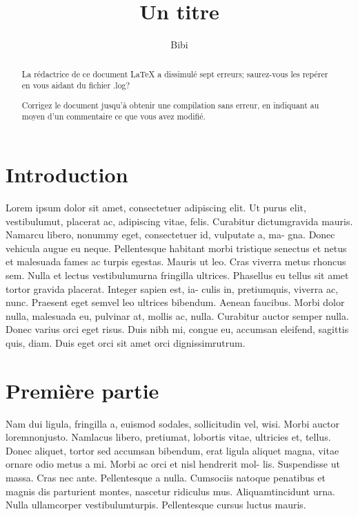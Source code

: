 \documentclass{article}
\title{Un titre}%
\author{Bibi}%
\begin{document}
	\maketitle

\begin{abstract}
La rédactrice de ce document \LaTeX{} a dissimulé sept erreurs; saurez-vous les repérer en vous aidant du fichier .log? 

Corrigez le document jusqu'à obtenir une compilation sans erreur, en indiquant au moyen d'un commentaire ce que vous avez modifié.
\end{abstract}%

\section*{Introduction}

Lorem ipsum dolor sit amet, consectetuer adipiscing elit. Ut purus elit,
vestibulumut, placerat ac, adipiscing vitae, felis. Curabitur dictumgravida
mauris. Namarcu libero, nonummy eget, consectetuer id, vulputate a, ma-
gna. Donec vehicula augue eu neque. Pellentesque habitant morbi tristique
senectus et netus et malesuada fames ac turpis egestas. Mauris ut leo. Cras
viverra metus rhoncus sem. Nulla et lectus vestibulumurna fringilla ultrices.
Phasellus eu tellus sit amet tortor gravida placerat. Integer sapien est, ia-
culis in, pretiumquis, viverra ac, nunc. Praesent eget semvel leo ultrices
bibendum. Aenean faucibus. Morbi dolor nulla, malesuada eu, pulvinar at,
mollis ac, nulla. Curabitur auctor semper nulla. Donec varius orci eget risus.
Duis nibh mi, congue eu, accumsan eleifend, sagittis quis, diam. Duis eget
orci sit amet orci dignissimrutrum.

\section{Première partie}%
Nam dui ligula, fringilla a, euismod sodales, sollicitudin vel, wisi. Morbi
auctor loremnonjusto. Namlacus libero, pretiumat, lobortis vitae, ultricies
et, tellus. Donec aliquet, tortor sed accumsan bibendum, erat ligula aliquet
magna, vitae ornare odio metus a mi. Morbi ac orci et nisl hendrerit mol-
lis. Suspendisse ut massa. Cras nec ante. Pellentesque a nulla. Cumsociis
natoque penatibus et magnis dis parturient montes, nascetur ridiculus mus.
Aliquamtincidunt urna. Nulla ullamcorper vestibulumturpis. Pellentesque
cursus luctus mauris.
\end{document}
